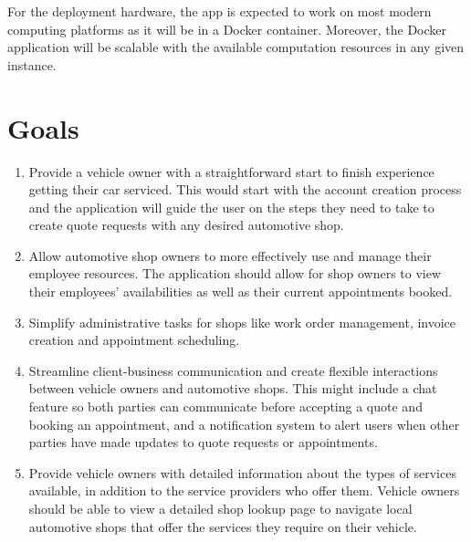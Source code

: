 \documentclass{article}
\begin{document}
\noindent For the deployment hardware, the app is expected to work on most
modern computing platforms as it will be in a Docker container. Moreover, the
Docker application will be scalable with the available computation resources in
any given instance.

\section{Goals}


\begin{enumerate}
    \item Provide a vehicle owner with a straightforward start to finish experience getting their car serviced. This would start with the account creation process and the application will guide the user on the steps they need to take to create quote requests with any desired automotive shop.
    \item Allow automotive shop owners to more effectively use and manage their employee resources. The application should allow for shop owners to view their employees' availabilities as well as their current appointments booked.
    \item Simplify administrative tasks for shops like work order management, invoice creation and appointment scheduling.
    \item Streamline client-business communication and create flexible interactions between vehicle owners and automotive shops. This might include a chat feature so both parties can communicate before accepting a quote and booking an appointment, and a notification system to alert users when other parties have made updates to quote requests or appointments.
    \item Provide vehicle owners with detailed information about the types of services available, in addition to the service providers who offer them. Vehicle owners should be able to view a detailed shop lookup page to navigate local automotive shops that offer the services they require on their vehicle.
\end{enumerate}
\end{document}
